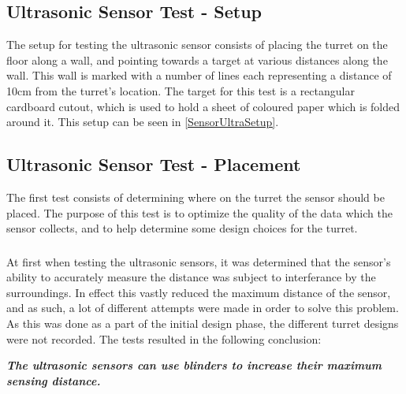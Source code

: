 \subsection{Ultrasonic Sensor Test - Setup}\label{UltraTestSetup}
The setup for testing the ultrasonic sensor consists of placing the turret on
the floor along a wall, and pointing towards a target at various distances along
the wall. This wall is marked with a number of lines each representing a
distance of 10cm from the turret's location. The target for this test is a
rectangular cardboard cutout, which is used to hold a sheet of coloured paper
which is folded around it. This setup can be seen in
\autoref{SensorUltraSetup}.


\subsection{Ultrasonic Sensor Test - Placement}\label{UltraTestPlacement}
The first test consists of determining where on the turret the sensor should be
placed. The purpose of this test is to optimize the quality of the data which
the sensor collects, and to help determine some design choices for the
turret.\nl


\subsubsection{} 
At first when testing the ultrasonic sensors, it was determined that the
sensor's ability to accurately measure the distance was subject to interferance
by the surroundings. In effect this vastly reduced the maximum distance of the
sensor, and as such, a lot of different attempts were made in order to solve
this problem. As this was done as a part of the initial design phase, the
different turret designs were not recorded. The tests resulted in the
following conclusion:\nl

\textit{\textbf{The ultrasonic sensors can use blinders to increase their
maximum sensing distance.}}\nl

